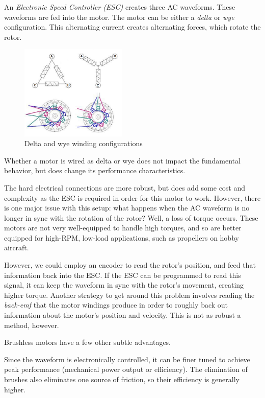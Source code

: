 \documentclass[10pt,letterpaper]{book}
\begin{document}
An \textit{Electronic Speed Controller (ESC)} creates three AC waveforms. These waveforms are fed into the motor. The motor can be either a \textit{delta} or \textit{wye} configuration. This alternating current creates alternating forces, which rotate the rotor.

\begin{figure}[H]
	\includegraphics[width=0.45\textwidth]{imgs/delta_wye.png}
	\caption{Delta and wye winding configurations}
\end{figure}

Whether a motor is wired as delta or wye does not impact the fundamental behavior, but does change its performance characteristics.

The hard electrical connections are more robust, but does add some cost and complexity as the ESC is required in order for this motor to work. However, there is one major issue with this setup: what happens when the AC waveform is no longer in sync with the rotation of the rotor? Well, a loss of torque occurs. These motors are not very well-equipped to handle high torques, and so are better equipped for high-RPM, low-load applications, such as propellers on hobby aircraft.

However, we could employ an encoder to read the rotor's position, and feed that information back into the ESC. If the ESC can be programmed to read this signal, it can keep the waveform in sync with the rotor's movement, creating higher torque. Another strategy to get around this problem involves reading the \textit{back-emf} that the motor windings produce in order to roughly back out information about the motor's position and velocity. This is not as robust a method, however.

Brushless motors have a few other subtle advantages.

Since the waveform is electronically controlled, it can be finer tuned to achieve peak performance (mechanical power output or efficiency). The elimination of brushes also eliminates one source of friction, so their efficiency is generally higher.
\end{document}
